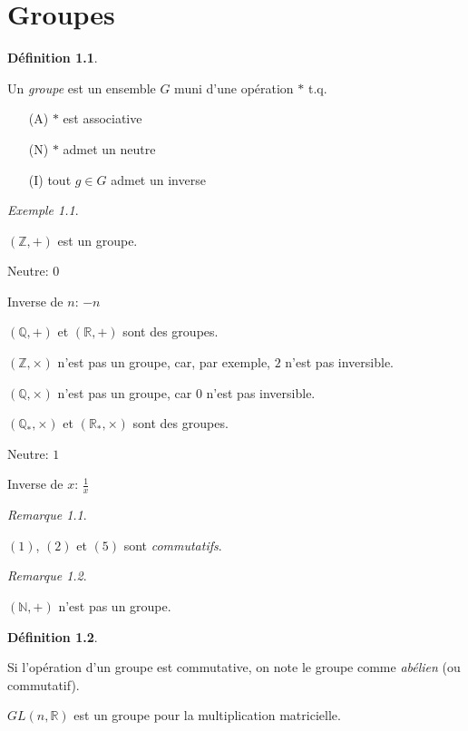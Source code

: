 \documentclass{report}
\newcommand*{\reels}{\mathbb{R}}
\newcommand*{\entiers}{\mathbb{Z}}
\newcommand*{\rationels}{\mathbb{Q}}
\newcommand*{\naturels}{\mathbb{N}}
\theoremstyle{definition}
\newtheorem*{defin}{D\'efinition}
\theoremstyle{remark}
\newtheorem*{exem}{Exemple}
\newtheorem*{rema}{Remarque}
\begin{document}
	\chapter{Groupes}
	\begin{defin}
		~

		Un \emph{groupe} est un ensemble $G$ muni d'une op\'eration $*$ t.q.
		\begin{itemize}
			\item[(A)] $*$ est associative
			\item[(N)] $*$ admet un neutre
			\item[(I)] tout $g \in G$ admet un inverse
		\end{itemize}
	\end{defin}
	\begin{exem}
		~

		\begin{nlist}
			\item $(\entiers,+)$ est un groupe.

			Neutre: $0$

			Inverse de $n$: $-n$
			\item $(\rationels,+)$ et $(\reels,+)$ sont des groupes.
			\item $(\entiers,\times)$ n'est pas un groupe, car, par exemple, $2$ n'est pas inversible.
			\item $(\rationels,\times)$ n'est pas un groupe, car $0$ n'est pas inversible.
			\item $(\rationels_*,\times)$ et $(\reels_*,\times)$ sont des groupes.

			Neutre: $1$

			Inverse de $x$: $\frac{1}{x}$
		\end{nlist}
		\begin{rema}
			~

			$(1)$, $(2)$ et $(5)$ sont \emph{commutatifs}.
		\end{rema}
		\begin{rema}
			~

			$(\naturels,+)$ n'est pas un groupe.
		\end{rema}
		\begin{defin}
			~

			Si l'op\'eration d'un groupe est commutative, on note le groupe comme \emph{ab\'elien} (ou commutatif).
		\end{defin}
		\begin{nlist}[resume]
			\item $GL(n,\reels)$ est un groupe pour la multiplication matricielle.


\end{nlist}
\end{exem}
\end{document}

